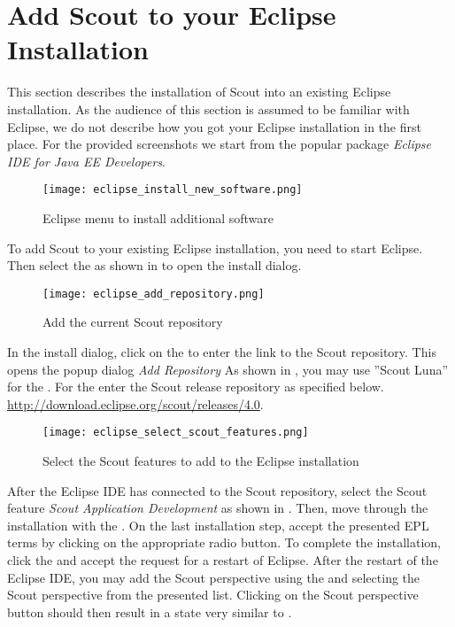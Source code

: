 \documentclass[a4paper,10pt,twoside]{book}
\begin{document}
\section{Add Scout to your Eclipse Installation}

This section describes the installation of Scout into an existing Eclipse installation.
As the audience of this section is assumed to be familiar with Eclipse, we do not describe how you got your Eclipse installation in the first place.
For the provided screenshots we start from the popular package \textit{Eclipse IDE for Java EE Developers}.

\begin{figure}
\texttt{[image: eclipse\_install\_new\_software.png]}
\caption{Eclipse menu to install additional software}
\end{figure}

To add Scout to your existing Eclipse installation, you need to start Eclipse.
Then select the  as shown in  to open the install dialog.

\begin{figure}
\texttt{[image: eclipse\_add\_repository.png]}
\caption{Add the current Scout repository}
\end{figure}

In the install dialog, click on the  to enter the link to the Scout repository.
This opens the popup dialog \textit{Add Repository}
As shown in , you may use ''Scout Luna'' for the .
For the  enter the Scout release repository as specified below.
\url{http://download.eclipse.org/scout/releases/4.0}.

\begin{figure}
\texttt{[image: eclipse\_select\_scout\_features.png]}
\caption{Select the Scout features to add to the Eclipse installation}
\end{figure}

After the Eclipse IDE has connected to the Scout repository, select the Scout feature \textit{Scout Application Development} as shown in .
Then, move through the installation with the .
On the last installation step, accept the presented EPL terms by clicking on the appropriate radio button. 
To complete the installation, click the  and accept the request for a restart of Eclipse.
After the restart of the Eclipse IDE, you may add the Scout perspective using the  and selecting the Scout perspective from the presented list. 
Clicking on the Scout perspective button should then result in a state very similar to .
\end{document}
